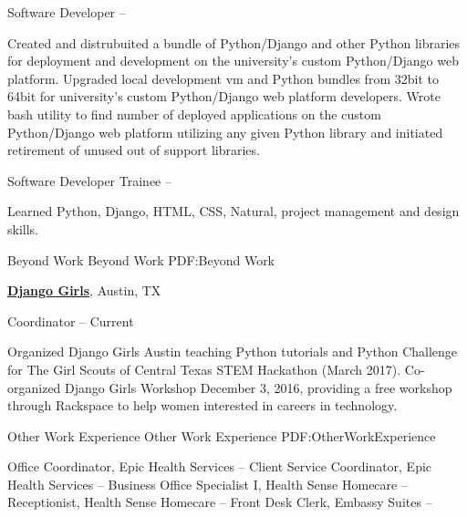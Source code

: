 \documentclass[letterpaper,MMMyyyy,nonstopmode]{simpleresumecv}
\begin{document}
\begin{Body}
\Gap
\BulletItem
Software Developer 
\hfill
{} --
\begin{Detail}
\SubBulletItem
Created and distrubuited a bundle of Python/Django and other Python libraries for deployment and development on the university's custom Python/Django web platform.
\SubBulletItem
Upgraded local development vm and Python bundles from 32bit to 64bit for university's custom Python/Django web platform developers.
\SubBulletItem
Wrote bash utility to find number of deployed applications on the custom Python/Django web platform utilizing any given Python library and initiated retirement of unused out of support libraries.
\end{Detail}

\Gap
\BulletItem
Software Developer Trainee
\hfill
{} --
\begin{Detail}
\SubBulletItem
Learned Python, Django, HTML, CSS, Natural, project management and design skills.
\end{Detail}



\Section
{Beyond Work}
{Beyond Work}
{PDF:Beyond Work}

\Entry
\href{https://djangogirls.org/austin/}
{\textbf{Django Girls}},
Austin, TX

\Gap
\BulletItem
Coordinator
\hfill
{} --
Current
\begin{Detail}
\SubBulletItem
Organized Django Girls Austin teaching Python tutorials and Python Challenge for The Girl Scouts of Central Texas STEM Hackathon (March 2017). 
\SubBulletItem
\href{https://www.gitbook.com/book/megwill4268/learning-python-on-mars/details}{}
\SubBulletItem
Co-organized Django Girls Workshop December 3, 2016, providing a free workshop through Rackspace to help women interested in careers in technology.
\end{Detail}



\Section
{Other Work\newline
Experience}
{Other Work Experience}
{PDF:OtherWorkExperience}

\Gap
\BulletItem
Office Coordinator, Epic Health Services 
\hfill
{} --
\BulletItem
Client Service Coordinator, Epic Health Services 
\hfill
{} --
\BulletItem
Business Office Specialist I, Health Sense Homecare 
\hfill
{} --
\BulletItem
Receptionist, Health Sense Homecare
\hfill
{} --
\BulletItem
Front Desk Clerk, Embassy Suites
\hfill
{} --




\end{Body}
\end{document}
